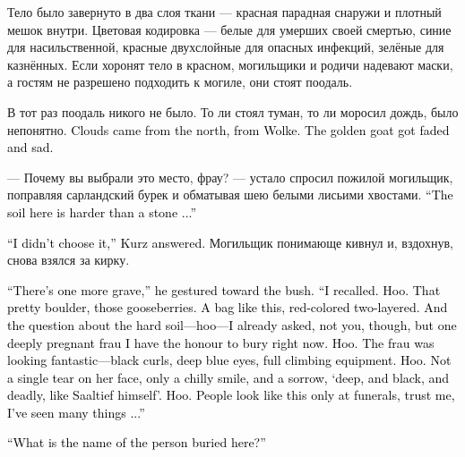 \documentclass[a4paper,12pt,fleqn]{book}\usepackage{cooltooltips}\usepackage{polyglossia}\setdefaultlanguage[babelshorthands=true]{russian}\setotherlanguage{english}\defaultfontfeatures{Ligatures=TeX,Mapping=tex-text} \usepackage{xcolor}\definecolor{lightgray}{HTML}{bbbbbb}\color{lightgray}\newcommand{\ml}[3]{\textenglish{\textcolor{black}{#3}}}
\begin{document}
Тело было завернуто в два слоя ткани --- красная парадная снаружи и плотный мешок внутри.
Цветовая кодировка --- белые для умерших своей смертью, синие для насильственной, красные двухслойные для опасных инфекций, зелёные для казнённых.
Если хоронят тело в красном, могильщики и родичи надевают маски, а гостям не разрешено подходить к могиле, они стоят поодаль.

В тот раз поодаль никого не было.
То ли стоял туман, то ли моросил дождь, было непонятно.
\ml{$0$}
{Облака пришли с севера, с Вольке.}
{Clouds came from the north, from Wolke.}
\ml{$0$}
{Золотой козёл потускнел и погрустнел.}
{The golden goat got faded and sad.}

--- Почему вы выбрали это место, фрау? --- устало спросил пожилой могильщик, поправляя сарландский бурек и обматывая шею белыми лисьими хвостами.
\ml{$0$}
{--- Здесь земля твёрже камня...}
{``The soil here is harder than a stone ...''}

\ml{$0$}
{--- Я его не выбирала, --- ответила Курц.}
{``I didn't choose it,'' Kurz answered.}
Могильщик понимающе кивнул и, вздохнув, снова взялся за кирку.

\ml{$0$}
{--- Здесь ещё одна могила, --- он кивнул в сторону куста.}
{``There's one more grave,'' he gestured toward the bush.}
\ml{$0$}
{--- Я вспомнил.}
{``I recalled.}
\ml{$0$}
{Ху.}
{Hoo.}
\ml{$0$}
{И булыжник этот красивый, и смородину.}
{That pretty boulder, those gooseberries.}
\ml{$0$}
{И такой же мешок, красный, двухслойный.}
{A bag like this, red-colored two-layered.}
\ml{$0$}
{И вопрос насчет твёрдой земли --- эх --- я уже задавал, только не вам, а одной глубоко беременной юной фрау, которую имею честь хоронить сейчас.}
{And the question about the hard soil---hoo---I already asked, not you, though, but one deeply pregnant frau I have the honour to bury right now.}
\ml{$0$}
{Ху.}
{Hoo.}
\ml{$0$}
{Фрау выглядела потрясающе --- чёрные кудри, синие глаза, полная скальная экипировка.}
{The frau was looking fantastic---black curls, deep blue eyes, full climbing equipment.}
\ml{$0$}
{Ху.}
{Hoo.}
\ml{$0$}
{На лице ни слезинки, только стылая улыбка и печаль, <<глубокая, чёрная и смертоносная, как Заалтиф>>.}
{Not a single tear on her face, only a chilly smile, and a sorrow, `deep, and black, and deadly, like Saaltief himself'.}
\ml{$0$}
{Ху.}
{Hoo.}
\ml{$0$}
{Так красиво люди выглядят только на похоронах, поверьте мне, я уж много повидал...}
{People look like this only at funerals, trust me, I've seen many things ...''}

\ml{$0$}
{--- Как звали человека, который тут похоронен?}
{``What is the name of the person buried here?''}
\end{document}
